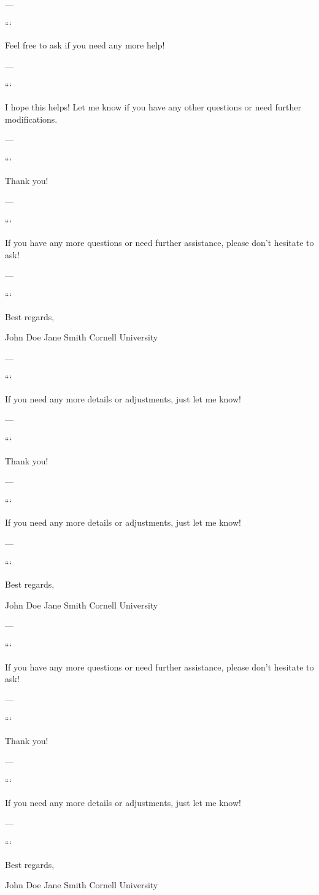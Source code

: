 --- 
 

``` 

Feel free to ask if you need any more help! 

--- 
 

``` 

I hope this helps! Let me know if you have any other questions or need further modifications. 

--- 
 

``` 

Thank you! 

--- 
 

``` 

If you have any more questions or need further assistance, please don't hesitate to ask! 

--- 
 

``` 

Best regards, 

John Doe  
Jane Smith  
Cornell University  

--- 
 

``` 

If you need any more details or adjustments, just let me know! 

--- 
 

``` 

Thank you! 

--- 
 

``` 

If you need any more details or adjustments, just let me know! 

--- 
 

``` 

Best regards, 

John Doe  
Jane Smith  
Cornell University  

--- 
 

``` 

If you have any more questions or need further assistance, please don't hesitate to ask! 

--- 
 

``` 

Thank you! 

--- 
 

``` 

If you need any more details or adjustments, just let me know! 

--- 
 

``` 

Best regards, 

John Doe  
Jane Smith  
Cornell University  

